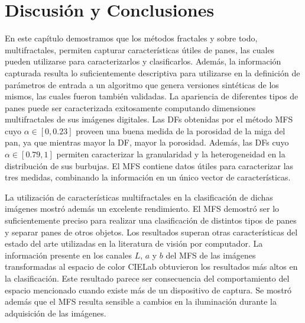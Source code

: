 
\section{Discusión y Conclusiones}

En este capítulo demostramos que los métodos fractales y sobre todo, multifractales, permiten capturar características útiles de panes, las cuales pueden utilizarse para caracterizarlos y clasificarlos.
Además, la información capturada resulta lo suficientemente descriptiva para utilizarse en la definición de parámetros de entrada a un algoritmo que genera versiones sintéticas de los mismos, las cuales fueron también validadas.
La apariencia de diferentes tipos de panes puede ser caracterizada exitosamente computando dimensiones multifractales de sus imágenes digitales.
Las DFs obtenidas por el método MFS cuyo $\alpha \in [0,0.23]$ proveen una buena medida de la porosidad de la miga del pan, ya que mientras mayor la DF, mayor la porosidad.
Además, las DFs cuyo $\alpha \in [0.79,1]$ permiten caracterizar la granularidad y la heterogeneidad en la distribución de sus burbujas.
El MFS contiene datos útiles para caracterizar las tres medidas, combinando la información en un único vector de características.

La utilización de características multifractales en la clasificación de dichas imágenes mostró además un excelente rendimiento.
El MFS demostró ser lo suficientemente preciso para realizar una clasificación de distintos tipos de panes y separar panes de otros objetos.
Los resultados superan otras características del estado del arte utilizadas en la literatura de visión por computador.
La información presente en los canales $L$, $a$ y $b$ del MFS de las imágenes transformadas al espacio de color CIELab obtuvieron los resultados más altos en la clasificación.
Este resultado parece ser consecuencia del comportamiento del espacio mencionado cuando existe más de un dispositivo de captura.
Se mostró además que el MFS resulta sensible a cambios en la iluminación durante la adquisición de las imágenes.

